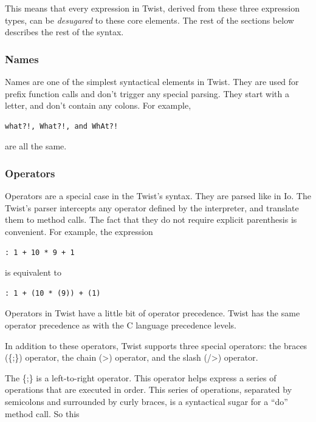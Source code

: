 This means that every expression in Twist, derived from these three expression types, can be \emph{desugared} to these core elements. The rest of the sections below describes the rest of the syntax.

\subsubsection{Names}
\label{sec:names}

Names are one of the simplest syntactical elements in Twist. They are used for prefix function calls and don't trigger any special parsing. They start with a letter, and don't contain any colons. For example, 

\begin{verbatim}
what?!, What?!, and WhAt?! 
\end{verbatim} 

are all the same.

\subsubsection{Operators}
\label{sec:operators}

Operators are a special case in the Twist's syntax. They are parsed like in Io. The Twist's parser intercepts any operator defined by the interpreter, and translate them to method calls. The fact that they do not require explicit parenthesis is convenient. For example, the expression

\begin{verbatim}
: 1 + 10 * 9 + 1
\end{verbatim}

is equivalent to

\begin{verbatim}
: 1 + (10 * (9)) + (1)
\end{verbatim}

Operators in Twist have a little  bit of operator precedence. Twist has the same operator precedence as with the C language precedence levels.

In addition to these operators, Twist supports three special operators: the braces (\{;\}) operator, the chain (>) operator, and the slash (/>) operator.

The \{;\} is a left-to-right operator. This operator helps express a series of operations that are executed in order. This series of operations, separated by semicolons and surrounded by curly braces, is a syntactical sugar for a ``do'' method call. So this

